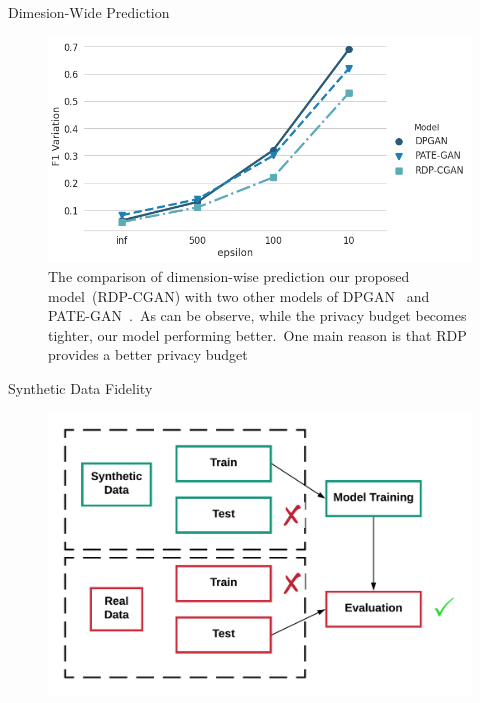\documentclass{beamer}
\begin{document}
\begin{frame}{Dimesion-Wide Prediction}

\begin{figure}[ht]
\centering
\includegraphics[scale=0.35]{_img/dwpred.png}
\caption{The comparison of dimension-wise prediction our proposed model~(RDP-CGAN) with two other models of DPGAN~\cite{xie2018differentially} and PATE-GAN~\cite{jordon2018pate}.~As can be observe, while the privacy budget becomes tighter, our model performing better.~One main reason is that RDP provides a better privacy budget}
\label{fig:dwpred}
\end{figure}

    
\end{frame}

\begin{frame}{Synthetic Data Fidelity}

\begin{center}
  \begin{figure}
\includegraphics[scale=0.15]{_img/datafidelity.png}
\end{figure}\label{fig:datafidelity}
\end{center}
    
\end{frame}
\end{document}
